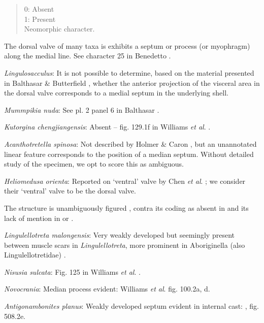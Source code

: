 \documentclass[]{book}
\theoremstyle{definition}
\theoremstyle{definition}
\theoremstyle{definition}
\theoremstyle{remark}
\begin{document}
\begin{quote}
0: Absent\\
1: Present\\
Neomorphic character.
\end{quote}

The dorsal valve of many taxa is exhibits a septum or process (or
myophragm) along the medial line. See character 25 in Benedetto
\citeyearpar{Benedetto2009iChaniella}.

\emph{Lingulosacculus}: It is not possible to determine, based on the
material presented in Balthasar \& Butterfield
\citeyearpar{Balthasar2009EarlyCambrian}, whether the anterior
projection of the visceral area in the dorsal valve corresponds to a
medial septum in the underlying shell.

\emph{Mummpikia nuda}: See pl. 2 panel 6 in Balthasar
\citeyearpar{Balthasar2008iMummpikia}.

\emph{Kutorgina chengjiangensis}: Absent -- fig. 129.1f in Williams
\emph{et al}. \citeyearpar{Williams2000BrachiopodaLinguliformea}.

\emph{Acanthotretella spinosa}: Not described by Holmer \& Caron
\citeyearpar{Holmer2006Aspinose}, but an unannotated linear feature
corresponds to the position of a median septum. Without detailed study
of the specimen, we opt to score this as ambiguous.

\emph{Heliomedusa orienta}: Reported on `ventral' valve by Chen \emph{et
al}. \citeyearpar{Chen2007Reinterpretationof}; we consider their
`ventral' valve to be the dorsal valve.

The structure is unambiguously figured \citep[e.g.~fig. 5.1
in][]{Chen2007Reinterpretationof}, contra its coding as absent in
\citet{Williams2000BrachiopodaLinguliformea} and its lack of mention in
\citet{Williams2007PartH} or \citet{Zhang2009Architectureand}.

\emph{Lingulellotreta malongensis}: Very weakly developed but seemingly
present between muscle scars in \emph{Lingulellotreta}, more prominent
in Aboriginella (also Lingulellotretidae) \citep[fig.
34]{Williams2000BrachiopodaLinguliformea}.

\emph{Nisusia sulcata}: Fig. 125 in Williams \emph{et al}.
\citeyearpar{Williams2000BrachiopodaLinguliformea}.

\emph{Novocrania}: Median process evident: Williams \emph{et al}.
\citeyearpar{Williams2000BrachiopodaLinguliformea} fig. 100.2a, d.

\emph{Antigonambonites planus}: Weakly developed septum evident in
internal cast: \citet{Williams2000BrachiopodaLinguliformea}, fig.
508.2e.
\end{document}
